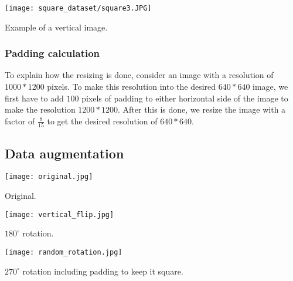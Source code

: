 \begin{marginfigure} %
	\texttt{[image: square\_dataset/square3.JPG]}
	\caption{Example of a vertical image.}
	\label{padding_2}
\end{marginfigure}

\subsubsection{Padding calculation}
To explain how the resizing is done, 
consider an image with a resolution of $1000*1200$ pixels. 
To make this resolution into the desired $640*640$ image, 
we first have to add $100$ pixels of padding to either horizontal side of the image to make the resolution $1200*1200$. 
After this is done, we resize the image with a factor of $\frac{8}{15}$ to get the desired resolution of $640*640$.



\newpage
\subsection{Data augmentation}

\begin{marginfigure}
	\texttt{[image: original.jpg]}
	\caption{Original.}
\end{marginfigure}

\begin{marginfigure}
	\texttt{[image: vertical\_flip.jpg]}
	\caption{$180^{\circ}$ rotation.}
\end{marginfigure}

\begin{marginfigure}
	\texttt{[image: random\_rotation.jpg]}
	\caption{$270^{\circ}$ rotation including padding to keep it square.}
\end{marginfigure}

